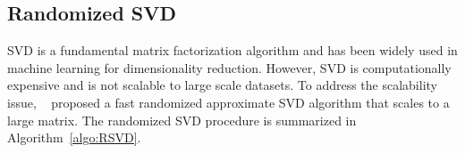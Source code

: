 




%

\subsection{Randomized SVD}
SVD is a fundamental matrix factorization algorithm and has been widely used in machine learning for dimensionality reduction. However, SVD is computationally expensive and is not scalable to large scale datasets. To address the scalability issue, ~\citep{halko2011} proposed a fast randomized approximate SVD algorithm that scales to a large matrix. The randomized SVD procedure is summarized in Algorithm~\ref{algo:RSVD}.

